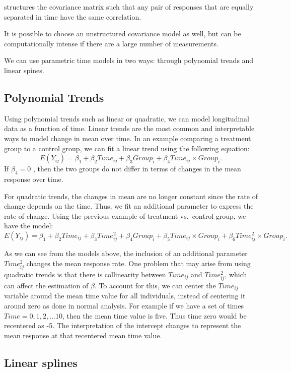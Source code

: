\documentclass[12pt, twoside]{amherstthesis}
\begin{document}
structures the covariance matrix such that any pair of responses that are equally separated in time have the same correlation.

It is possible to choose an unstructured covariance model as well, but can be computationally intense if there are a large number of measurements.

We can use parametric time models in two ways: through polynomial trends and linear spines.

\hypertarget{polynomial-trends}{%
\subsection{Polynomial Trends}\label{polynomial-trends}}

Using polynomial trends such as linear or quadratic, we can model longitudinal data as a function of time. Linear trends are the most common and interpretable ways to model change in mean over time. In an example comparing a treatment group to a control group, we can fit a linear trend using the following equation: \[E(Y_{ij}) = \beta_1 + \beta_2Time_{ij}+\beta_3Group_i+\beta_4Time_{ij} \times Group_i.\] If \(\beta_4 = 0\) , then the two groups do not differ in terms of changes in the mean response over time.

For quadratic trends, the changes in mean are no longer constant since the rate of change depends on the time. Thus, we fit an additional parameter to express the rate of change.
Using the previous example of treatment vs.~control group, we have the model:
\[E(Y_{ij}) = \beta_1 + \beta_2Time_{ij}+\beta_3Time^2_{ij}+\beta_4Group_i + \beta_5Time_{ij} \times Group_i + \beta_6Time^2_{ij} \times Group_i.\]

As we can see from the models above, the inclusion of an additional parameter \(Time^2_{ij}\) changes the mean response rate. One problem that may arise from using quadratic trends is that there is collinearity between \(Time_{ij}\) and \(Time^2_{ij}\), which can affect the estimation of \(\beta\). To account for this, we can center the \(Time_{ij}\) variable around the mean time value for all individuals, instead of centering it around zero as done in normal analysis. For example if we have a set of times \(Time = {0,1,2,...10}\), then the mean time value is five. Thus time zero would be recentered as -5. The interpretation of the intercept changes to represent the mean response at that recentered mean time value.

\hypertarget{linear-splines}{%
\subsection{Linear splines}\label{linear-splines}}
\end{document}
